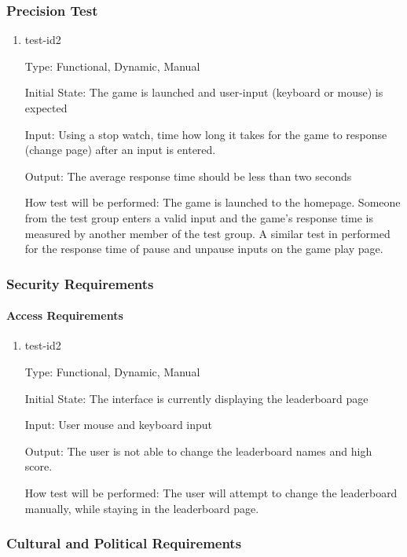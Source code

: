 \documentclass[12pt, titlepage]{article}
\begin{document}
\subsubsection{Precision Test}
\begin{enumerate}
\item{test-id2\\}

Type: Functional, Dynamic, Manual
					
Initial State: The game is launched and user-input (keyboard or mouse) is expected
					
Input: Using a stop watch, time how long it takes for the game to response (change page) after an input is entered.
					
Output: The average response time should be less than two seconds
					
How test will be performed: The game is launched to the homepage. Someone from the test group enters a valid input and the game's response time is measured by another member of the test group. A similar test in performed for the response time of pause and unpause inputs on the game play page.

\end{enumerate}

\subsubsection{Security Requirements}

\paragraph{Access Requirements}
\begin{enumerate}
\item{test-id2\\}

Type: Functional, Dynamic, Manual
					
Initial State: The interface is currently displaying the leaderboard page
					
Input: User mouse and keyboard input

Output: The user is not able to change the leaderboard names and high score.
					
How test will be performed: The user will attempt to change the leaderboard manually, while staying in the leaderboard page.

\end{enumerate}


\subsubsection{Cultural and Political Requirements}
\end{document}
